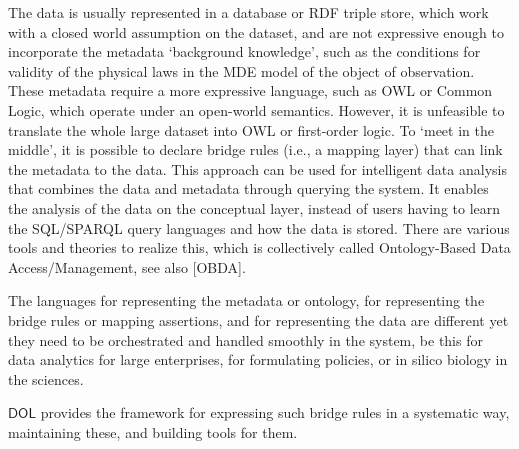 \documentclass[10pt,fleqn,final]{scrreprt}
\newcommand*{\termref}[1]{\index{#1}#1\xspace}
\newcommand*{\DOL}{\ensuremath{\mathsf{DOL}}\xspace}
\newenvironment{definitions}[0]{\medskip }{}
\begin{document}
\begin{definitions}
The data is usually represented in a database or RDF triple store, which work with a \termref{closed world assumption} on the dataset, and are not expressive enough to 
incorporate the metadata `background knowledge', such as the conditions for validity of the physical laws in the MDE model of the object of observation. These metadata 
require a more expressive language, such as OWL or Common Logic, which operate under an open-world semantics. However, it is unfeasible to translate the 
whole large dataset into OWL or first-order logic. To `meet in the middle', it is possible to declare bridge rules (i.e., a mapping layer) that can link the metadata to 
the data. This approach can be used for intelligent data analysis that combines the data and metadata through querying the system. It enables the analysis of the 
data on the conceptual layer, instead of users having to learn the SQL/SPARQL query languages and how the data is stored. There are various tools and theories 
to realize this, which is collectively called Ontology-Based Data Access/Management, see also [OBDA].

The languages for representing the metadata or ontology, for representing the bridge rules or mapping assertions, and for representing the data are different yet 
they need to be orchestrated and handled smoothly in the system, be this for data analytics for large enterprises, for formulating policies, or in silico biology in the 
sciences. 

\DOL  provides the framework for expressing such bridge rules in a systematic way, maintaining these, and building tools for them. 



\end{definitions}
\end{document}
